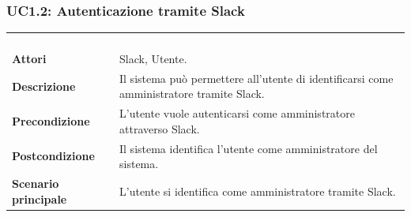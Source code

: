 \subsubsection{UC1.2: Autenticazione tramite Slack}
\label{UC1.2}
\begin{longtable}{l|p{10cm}}
\rowcolor[gray]{0.8} \multicolumn{2}{c}{} \\
\rowcolor[gray]{0.8} \multicolumn{2}{c}{\textbf{UC1.2 - Autenticazione tramite Slack}} \\
\rowcolor[gray]{0.8} \multicolumn{2}{c}{} \\
\hline
&\\
\textbf{Attori} & Slack, Utente.\\[7pt]
\textbf{Descrizione} & Il sistema può permettere all'utente di identificarsi come amministratore tramite Slack.\\[7pt]
\textbf{Precondizione} & L'utente vuole autenticarsi come amministratore attraverso Slack.\\[7pt]
\textbf{Postcondizione} & Il sistema identifica l'utente come amministratore del sistema.\\[7pt]
\textbf{Scenario principale} &L'utente si identifica come amministratore tramite Slack.\\[7pt]\hline
\end{longtable}

